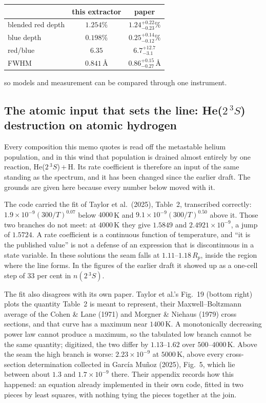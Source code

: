 \documentclass[english,a4paper]{my_memo}
\begin{document}
\begin{center}
\begin{tabular}{lcc}
\toprule
 & this extractor & paper \\
\midrule
blended red depth & $1.254\%$ & $1.24^{+0.22}_{-0.23}\%$ \\
blue depth        & $0.198\%$ & $0.25^{+0.14}_{-0.12}\%$ \\
red/blue          & $6.35$    & $6.7^{+12.7}_{-3.1}$ \\
FWHM              & $0.841$\,\AA{} & $0.86^{+0.15}_{-0.27}$\,\AA{} \\
\bottomrule
\end{tabular}
\end{center}

\noindent so models and measurement can be compared through one instrument.

\subsection{The atomic input that sets the line: He($2\,^3S$) destruction on
atomic hydrogen}
\label{sec:penningrate}

Every composition this memo quotes is read off the metastable helium
population, and in this wind that population is drained almost entirely by
one reaction, He($2\,^3S$)\,$+$\,H. Its rate coefficient is therefore an
input of the same standing as the spectrum, and it has been changed since the
earlier draft. The grounds are given here because every number below moved
with it.

\medskip
\noindent The code carried the fit of Taylor et al.\ (2025), Table~2,
transcribed correctly: $1.9\times10^{-9}(300/T)^{0.07}$ below $4000$\,K and
$9.1\times10^{-9}(300/T)^{0.50}$ above it. Those two branches do not meet: at
$4000$\,K they give $1.5849$ and $2.4921\times10^{-9}$, a jump of $1.5724$. A
rate coefficient is a continuous function of temperature, and ``it is the
published value'' is not a defense of an expression that is discontinuous in
a state variable. In these solutions the seam falls at $1.11$--$1.18\,R_p$,
inside the region where the line forms. In the figures of the earlier draft it
showed up as a one-cell step of $33$ per cent in $n(2\,^3S)$.

\medskip
\noindent The fit also disagrees with its own paper. Taylor et al.'s Fig.~19
(bottom right) plots the quantity Table~2 is meant to represent, their
Maxwell--Boltzmann average of the Cohen \& Lane (1971) and Morgner \& Niehaus
(1979) cross sections, and that curve has a maximum near $1400$\,K. A
monotonically decreasing power law cannot produce a maximum, so the tabulated
low branch cannot be the same quantity; digitized, the two differ by
$1.13$--$1.62$ over $500$--$4000$\,K. Above the seam the high branch is
worse: $2.23\times10^{-9}$ at $5000$\,K, above every cross-section
determination collected in Garc\'ia Mu\~noz (2025), Fig.~5, which lie between
about $1.3$ and $1.7\times10^{-9}$ there. Their appendix records how this
happened: an equation already implemented in their own code, fitted in two
pieces by least squares, with nothing tying the pieces together at the join.
\end{document}
